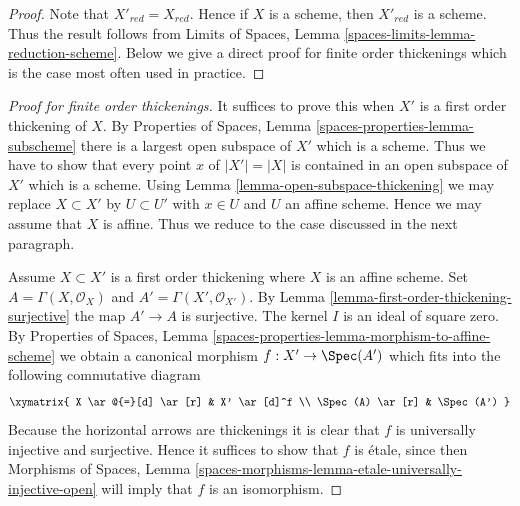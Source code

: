 \begin{proof}
Note that $X'_{red} = X_{red}$. Hence if $X$ is a scheme, then
$X'_{red}$ is a scheme. Thus the result follows from
Limits of Spaces, Lemma
\ref{spaces-limits-lemma-reduction-scheme}.
Below we give a direct proof for finite order thickenings which is
the case most often used in practice.
\end{proof}

\begin{proof}[Proof for finite order thickenings]
It suffices to prove this when $X'$ is a first order thickening of $X$. By
Properties of Spaces, Lemma \ref{spaces-properties-lemma-subscheme}
there is a largest open subspace of $X'$ which is a scheme. Thus we have
to show that every point $x$ of $|X'| = |X|$ is contained in an open subspace of
$X'$ which is a scheme. Using
Lemma \ref{lemma-open-subspace-thickening}
we may replace $X \subset X'$ by $U \subset U'$ with $x \in U$ and $U$
an affine scheme. Hence we may assume that $X$ is affine.
Thus we reduce to the case discussed in the next paragraph.

\medskip\noindent
Assume $X \subset X'$ is a first order thickening where $X$ is an affine
scheme. Set $A = \Gamma(X, \mathcal{O}_X)$ and
$A' = \Gamma(X', \mathcal{O}_{X'})$. By
Lemma \ref{lemma-first-order-thickening-surjective}
the map $A' \to A$ is surjective. The kernel $I$ is an ideal of square zero. By
Properties of Spaces,
Lemma \ref{spaces-properties-lemma-morphism-to-affine-scheme}
we obtain a canonical morphism $f : X' \to \Spec(A')$ which fits
into the following commutative diagram
$$
\xymatrix{
X \ar@{=}[d] \ar[r] &  X' \ar[d]^f \\
\Spec(A) \ar[r] & \Spec(A')
}
$$
Because the horizontal arrows are thickenings it is clear that $f$ is
universally injective and surjective. Hence it suffices to show that
$f$ is \'etale, since then
Morphisms of Spaces,
Lemma \ref{spaces-morphisms-lemma-etale-universally-injective-open}
will imply that $f$ is an isomorphism.


\end{proof}
